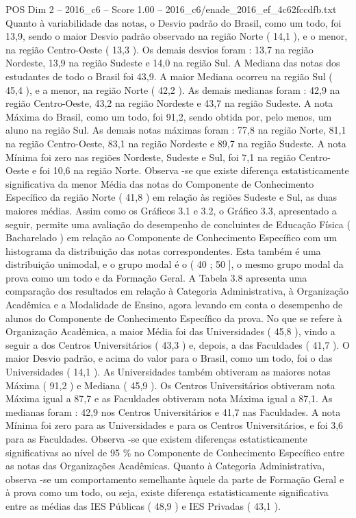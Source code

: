 \begin{textsample}{POS Dim 2 – 2016\_c6 – Score 1.00 – 2016\_c6/enade\_2016\_ef\_4c62fccdfb.txt}
Quanto à variabilidade das notas, o Desvio padrão do Brasil, como um todo, foi 13,9, sendo o maior Desvio padrão observado na região Norte ( 14,1 ), e o menor, na região Centro-Oeste ( 13,3 ).
Os demais desvios foram : 13,7 na região Nordeste, 13,9 na região Sudeste e 14,0 na região Sul.
A Mediana das notas dos estudantes de todo o Brasil foi 43,9.
A maior Mediana ocorreu na região Sul ( 45,4 ), e a menor, na região Norte ( 42,2 ).
As demais medianas foram : 42,9 na região Centro-Oeste, 43,2 na região Nordeste e 43,7 na região Sudeste.
A nota Máxima do Brasil, como um todo, foi 91,2, sendo obtida por, pelo menos, um aluno na região Sul.
As demais notas máximas foram : 77,8 na região Norte, 81,1 na região Centro-Oeste, 83,1 na região Nordeste e 89,7 na região Sudeste.
A nota Mínima foi zero nas regiões Nordeste, Sudeste e Sul, foi 7,1 na região Centro-Oeste e foi 10,6 na região Norte.
Observa -se que existe diferença estatisticamente significativa da menor Média das notas do Componente de Conhecimento Específico da região Norte ( 41,8 ) em relação às regiões Sudeste e Sul, as duas maiores médias.
Assim como os Gráficos 3.1 e 3.2, o Gráfico 3.3, apresentado a seguir, permite uma avaliação do desempenho de concluintes de Educação Física ( Bacharelado ) em relação ao Componente de Conhecimento Específico com um histograma da distribuição das notas correspondentes.
Esta também é uma distribuição unimodal, e o grupo modal é o ( 40 ; 50 ], o mesmo grupo modal da prova como um todo e da Formação Geral.
A Tabela 3.8 apresenta uma comparação dos resultados em relação à Categoria Administrativa, à Organização Acadêmica e a Modalidade de Ensino, agora levando em conta o desempenho de alunos do Componente de Conhecimento Específico da prova.
No que se refere à Organização Acadêmica, a maior Média foi das Universidades ( 45,8 ), vindo a seguir a dos Centros Universitários ( 43,3 ) e, depois, a das Faculdades ( 41,7 ).
O maior Desvio padrão, e acima do valor para o Brasil, como um todo, foi o das Universidades ( 14,1 ).
As Universidades também obtiveram as maiores notas Máxima ( 91,2 ) e Mediana ( 45,9 ).
Os Centros Universitários obtiveram nota Máxima igual a 87,7 e as Faculdades obtiveram nota Máxima igual a 87,1.
As medianas foram : 42,9 nos Centros Universitários e 41,7 nas Faculdades.
A nota Mínima foi zero para as Universidades e para os Centros Universitários, e foi 3,6 para as Faculdades.
Observa -se que existem diferenças estatisticamente significativas ao nível de 95 \% no Componente de Conhecimento Específico entre as notas das Organizações Acadêmicas.
Quanto à Categoria Administrativa, observa -se um comportamento semelhante àquele da parte de Formação Geral e à prova como um todo, ou seja, existe diferença estatisticamente significativa entre as médias das IES Públicas ( 48,9 ) e IES Privadas ( 43,1 ).

\end{textsample}

